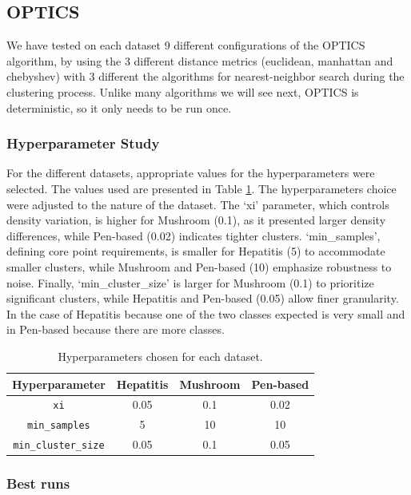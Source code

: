 \subsection{OPTICS}
We have tested on each dataset 9 different configurations of the OPTICS algorithm, by using the 3 different
distance metrics (euclidean, manhattan and chebyshev) with 3 different the algorithms for nearest-neighbor search
 during the clustering process. Unlike many algorithms we will see next, OPTICS is deterministic, so it only needs to be run once.
\subsubsection{Hyperparameter Study}
For the different datasets, appropriate values for the hyperparameters were selected. The values used are presented in 
Table \ref{tab:hyper-choices}. The hyperparameters choice were adjusted to the nature of the dataset. The `xi' parameter, which 
controls density variation, is higher for Mushroom (0.1), as it presented larger density differences, while Pen-based (0.02) 
indicates tighter clusters. `min\_samples', defining core point requirements, is smaller for Hepatitis (5) to accommodate smaller
 clusters, while Mushroom and Pen-based (10) emphasize robustness to noise. 
 Finally, `min\_cluster\_size' is larger for Mushroom (0.1) to prioritize significant clusters, while Hepatitis and Pen-based (0.05) 
 allow finer granularity. In the case of Hepatitis because one of the two classes expected is very small and in Pen-based because
 there are more classes.


\begin{table}[h!]
    \centering
    \begin{tabular}{|c|c|c|c|}
    \hline
    \textbf{Hyperparameter}     & \textbf{Hepatitis} & \textbf{Mushroom} & \textbf{Pen-based} \\ \hline
    \texttt{xi}                 &  0.05         &   0.1       &  0.02         \\ \hline
    \texttt{min\_samples}       &     5      &     10     &     10   \\ \hline
    \texttt{min\_cluster\_size} &     0.05      &     0.1     &    0.05       \\ \hline
    \end{tabular}
	\caption{Hyperparameters chosen for each dataset.}\label{tab:hyper-choices}
    \end{table}
\subsubsection{Best runs}


